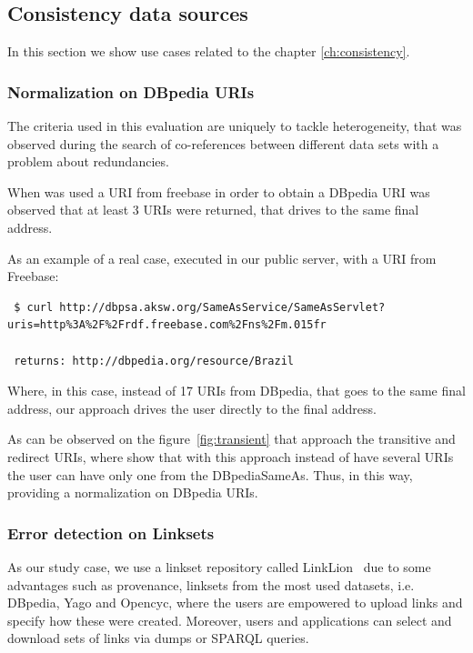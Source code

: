 \subsection{Consistency data sources}
In this section we show use cases related to the chapter \ref{ch:consistency}.

\subsubsection{Normalization on DBpedia URIs}
 The criteria used in this evaluation are uniquely to tackle heterogeneity, that was observed during the search of co-references between different data sets with a problem about redundancies.

 When was used a URI from freebase in order to obtain a DBpedia URI was observed that at least 3 URIs were returned, that drives to the same final address.

 As an example of a real case, executed in our public server, with a URI from Freebase:

 \begin{lstlisting}
 $ curl http://dbpsa.aksw.org/SameAsService/SameAsServlet?uris=http%3A%2F%2Frdf.freebase.com%2Fns%2Fm.015fr

 returns: http://dbpedia.org/resource/Brazil
 \end{lstlisting}

 Where, in this case, instead of 17 URIs from DBpedia, that goes to the same final address, our approach drives the user directly to the final address.

As can be observed on the figure~\ref{fig:transient} that approach the transitive and redirect URIs, where show that with this approach instead of have several URIs the user can have only one from the DBpediaSameAs. Thus, in this way, providing a normalization on DBpedia URIs.

\subsubsection{Error detection on Linksets}
 As our study case, we use a linkset repository called LinkLion~\cite{nentwig2014linklion} due to some advantages such as provenance, linksets from the most used datasets, i.e. DBpedia, Yago and Opencyc, where the users are empowered to upload links and specify how these were created. Moreover, users and applications can select and download sets of links via dumps or SPARQL queries. 

